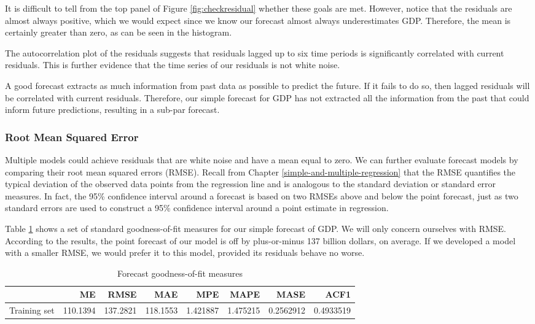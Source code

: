 \documentclass[
]{book}
\begin{document}
It is difficult to tell from the top panel of Figure \ref{fig:checkresidual} whether these goals are met. However, notice that the residuals are almost always positive, which we would expect since we know our forecast almost always underestimates GDP. Therefore, the mean is certainly greater than zero, as can be seen in the histogram.

The autocorrelation plot of the residuals suggests that residuals lagged up to six time periods is significantly correlated with current residuals. This is further evidence that the time series of our residuals is not white noise.

A good forecast extracts as much information from past data as possible to predict the future. If it fails to do so, then lagged residuals will be correlated with current residuals. Therefore, our simple forecast for GDP has not extracted all the information from the past that could inform future predictions, resulting in a sub-par forecast.

\hypertarget{root-mean-squared-error}{%
\subsubsection*{Root Mean Squared Error}\label{root-mean-squared-error}}


Multiple models could achieve residuals that are white noise and have a mean equal to zero. We can further evaluate forecast models by comparing their root mean squared errors (RMSE). Recall from Chapter \ref{simple-and-multiple-regression} that the RMSE quantifies the typical deviation of the observed data points from the regression line and is analogous to the standard deviation or standard error measures. In fact, the 95\% confidence interval around a forecast is based on two RMSEs above and below the point forecast, just as two standard errors are used to construct a 95\% confidence interval around a point estimate in regression.

Table \ref{tab:frmse} shows a set of standard goodness-of-fit measures for our simple forecast of GDP. We will only concern ourselves with RMSE. According to the results, the point forecast of our model is off by plus-or-minus 137 billion dollars, on average. If we developed a model with a smaller RMSE, we would prefer it to this model, provided its residuals behave no worse.

\begin{table}

\caption{\label{tab:frmse}Forecast goodness-of-fit measures}
\centering
\begin{tabular}[t]{l|r|r|r|r|r|r|r}
\hline
  & ME & RMSE & MAE & MPE & MAPE & MASE & ACF1\\
\hline
Training set & 110.1394 & 137.2821 & 118.1553 & 1.421887 & 1.475215 & 0.2562912 & 0.4933519\\
\hline
\end{tabular}
\end{table}
\end{document}
